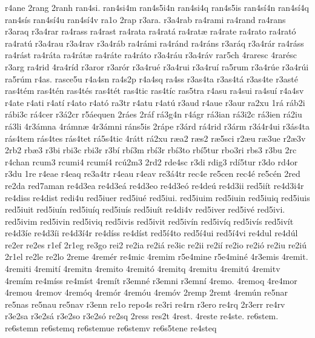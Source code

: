 {r4ane
2rang
2ranh
ran4si.
ran4si4m
ran4s5i4n
ran4si4q
ran4s5is
ran4s^^ed4n
ran4s^^ed4q
ran4s^^eds
ran4s^^ed4u
ran4s^^ed4v
ra1o
2rap
r3ara.
r3a4rab
ra4rami
ra4rand
ra4rans
r3araq
r3a4rar
ra4rass
ra4rast
ra4rata
ra4rat^^e1
ra4rat^^e6
ra4rate
ra4rato
ra4rat^^f3
ra4rat^^fa
r3a4rau
r3a4rav
r3a4r^^e1b
ra4r^^e1mi
ra4r^^e1nd
ra4r^^e1ns
r3ar^^e1q
r3a4r^^e1r
ra4r^^e1ss
ra4r^^e1st
ra4r^^e1ta
ra4r^^e1t^^e6
ra4r^^e1te
ra4r^^e1to
r3a4r^^e1u
r3a4r^^e1v
rar5ch
4raresc
4rar^^e9sc
r3arg
ra4rid
4ra4r^^edd
r3aror
r3ar^^f3r
r3a4ru^^e9
r3a4rui
r3a4ru^^ed
ra5rum
r3a4r^^fae
r3a4r^^fai
ra5r^^fam
r4as.
rasce5u
r4a4sn
ra4s2p
r4a4sq
ra4ss
r3as4ta
r3as4t^^e1
r3as4te
r3ast^^e9
ras4t^^e9m
ras4t^^e9n
ras4t^^e9s
ras4t^^e9t
ras4tic
ras4t^^edc
ras5tra
r4asu
ra4sui
ra4su^^ed
r4a4sv
r4ate
r4ati
r4at^^ed
r4ato
r4at^^f3
ra3tr
r4atu
r4at^^fa
r3aud
r4aue
r3aur
ra2xu
1r^^e1
r^^e1b2i
r^^e1bi3c
r^^e14cer
r3^^e12cr
r5^^e1equen
2r^^e1es
2r^^e1f
r^^e13g4n
r4^^e1gr
r^^e13ian
r^^e13i2c
r^^e13ien
r^^e12iu
r^^e13li
4r3^^e1mna
4r^^e1mn^^e6
4r3^^e1mni
r^^e1ns5is
2r^^e1pe
r3^^e1rd
r^^e14rid
r3^^e1rm
r3^^e14r4ui
r3^^e1s4ta
r^^e1s4tem
r^^e1s4tes
r^^e1s4tet
r^^e15s4tic
4r^^e1tt
r^^e12xu
r^^e6a2
r^^e6s2
r^^e65sci
r2^^e6u
r^^e63ue
r2^^e63v
2rb2
rb^^e63
r3bi
rbi3c
rbi3r
r3b^^ed
rb^^ed3m
rb^^ed3r
rb^^ed3to
rb^^ed5tur
rbo3ri
rbs3
r3bu
2rc
r4chan
rcum3
rcumi4
rcum^^ed4
rc^^fa2m3
2rd2
rde4sc
r3di
rdig3
rd^^ed5tur
r3do
rd4or
r3du
1re
r4eae
r4eaq
re3a4tr
r4eau
r4eav
re3^^e14tr
rec4e
re5cen
rec4^^e9
re5c^^e9n
2red
re2da
red7aman
re4d3ea
re4d3e^^e1
re4d3eo
re4d3e^^f3
re4de^^fa
re4d3ii
red5i^^edt
re4d3i4r
re4diss
re4dist
redi4u
red5iuer
red5iu^^e9
red5iui.
red5iuim
red5iuin
red5iuiq
red5iuis
red5iuit
red5iu^^edn
red5iu^^edq
red5iu^^eds
red5iu^^edt
re4di4v
red5iver
red5iv^^e9
red5ivi.
red5ivim
red5ivin
red5iviq
red5ivis
red5ivit
red5iv^^edn
red5iv^^edq
red5iv^^eds
red5iv^^edt
re4d3^^ede
re4d3^^edi
re4d3^^ed4r
re4d^^edss
re4d^^edst
red5^^ed4to
red5^^ed4ui
red5^^ed4vi
re4dul
re4d^^fal
re2er
re2es
r1ef
2r1eg
re3go
rei2
re2ia
re2i^^e1
re3ic
re2ii
re2i^^ed
re2io
re2i^^f3
re2iu
re2i^^fa
2r1el
re2le
re2lo
2reme
4rem^^e9r
re4mic
4remim
r5e4mine
r5e4min^^e9
4r3emis
4remit.
4remiti
4remit^^ed
4remitn
4remito
4remit^^f3
4remitq
4remitu
4remit^^fa
4remitv
4rem^^edm
re4m^^edss
re4m^^edst
4rem^^edt
r3emn^^e9
r3emni
r3emn^^ed
4remo.
4remoq
4re4mor
4remou
4remov
4rem^^f3q
4rem^^f3r
4rem^^f3u
4rem^^f3v
2remp
2remt
4rem^^fan
re5nar
re5nas
re5nau
re5nav
r3enn
re1o
repo4s
re3ri
re4rn
r3ero
re4rq
2r3err
re4rv
r3e2sa
r3e2s^^e1
r3e2so
r3e2s^^f3
re2sq
2ress
res2t
4rest.
4reste
re4ste.
re6stem.
re6stemn
re6stemq
re6stemue
re6stemv
re6s5tene
re4steq
}

